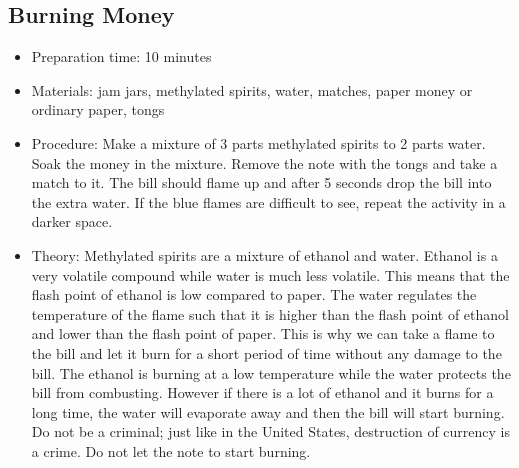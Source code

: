 \subsection{Burning Money}
\begin{itemize}
\item{Preparation time: 10 minutes}
\item{Materials: jam jars, methylated spirits, water, matches, paper money or ordinary paper, tongs}
\item{Procedure: Make a mixture of 3 parts methylated spirits to 2 parts water. Soak the money in the mixture. Remove the note with the tongs and take a match to it. The bill should flame up and after 5 seconds drop the bill into the extra water. If the blue flames are difficult to see, repeat the activity in a darker space.}
\item{Theory: Methylated spirits are a mixture of ethanol and water. Ethanol is a very volatile compound while water is much less volatile. This means that the flash point of ethanol is low compared to paper. The water regulates the temperature of the flame such that it is higher than the flash point of ethanol and lower than the flash point of paper. This is why we can take a flame to the bill and let it burn for a short period of time without any damage to the bill. The ethanol is burning at a low temperature while the water protects the bill from combusting. However if there is a lot of ethanol and it burns for a long time, the water will evaporate away and then the bill will start burning. Do not be a criminal; just like in the United States, destruction of currency is a crime. Do not let the note to start burning.}
\end{itemize}

